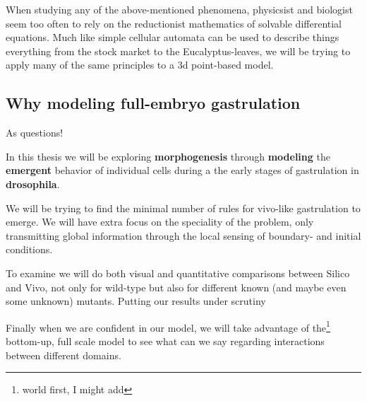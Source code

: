 When studying any of the above-mentioned phenomena, physicsist and biologist seem too often to rely on the reductionist mathematics of solvable differential equations. Much like simple cellular automata can be used to describe things everything from the stock market to the Eucalyptus-leaves, we will be trying to apply many of the same principles to a 3d point-based model.

\subsection{Why modeling full-embryo gastrulation }
As questions!








In this thesis we will be exploring \textbf{morphogenesis} through \textbf{modeling} the \textbf{emergent} behavior of individual cells during a the early stages of  gastrulation in \textbf{drosophila}.

We will be trying to find the minimal number of rules for vivo-like gastrulation to emerge. We will have extra focus on the speciality of the problem, only transmitting global information through the local sensing of boundary- and initial conditions.

To examine we will do both visual and quantitative comparisons between Silico and Vivo, not only for wild-type but also for different known (and maybe even some unknown) mutants. Putting our results under scrutiny 

Finally when we are confident in our model, we will take advantage of the\footnote{world first, I might add} bottom-up, full scale model to see what can we say regarding interactions between different domains.\\






